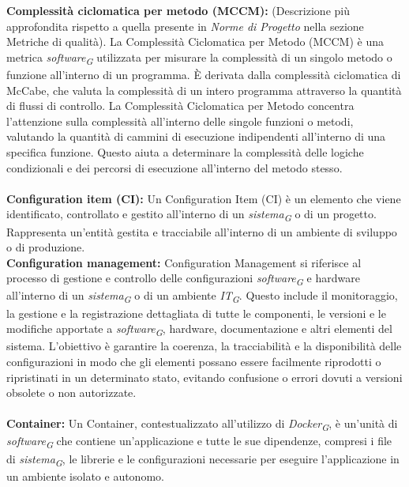 \documentclass{article}
\begin{document}
\\
\\
\textbf{Complessità ciclomatica per metodo (MCCM):} (Descrizione più approfondita rispetto a quella presente in \textit{Norme di Progetto} nella sezione Metriche di qualità). La Complessità Ciclomatica per Metodo (MCCM) è una metrica \textit{software}\textsubscript{\textit{G}} utilizzata per misurare la complessità di un singolo metodo o funzione all'interno di un programma. È derivata dalla complessità ciclomatica di McCabe, che valuta la complessità di un intero programma attraverso la quantità di flussi di controllo.
La Complessità Ciclomatica per Metodo concentra l'attenzione sulla complessità all'interno delle singole funzioni o metodi, valutando la quantità di cammini di esecuzione indipendenti all'interno di una specifica funzione. Questo aiuta a determinare la complessità delle logiche condizionali e dei percorsi di esecuzione all'interno del metodo stesso.
\\
\\
\textbf{Configuration item (CI):} Un Configuration Item (CI) è un elemento che viene identificato, controllato e gestito all'interno di un \textit{sistema}\textsubscript{\textit{G}} o di un progetto. Rappresenta un'entità gestita e tracciabile all'interno di un ambiente di sviluppo o di produzione.
\pagebreak
\\
\textbf{Configuration management:} Configuration Management si riferisce al processo di gestione e controllo delle configurazioni \textit{software}\textsubscript{\textit{G}} e hardware all'interno di un \textit{sistema}\textsubscript{\textit{G}} o di un ambiente \textit{IT}\textsubscript{\textit{G}}. Questo include il monitoraggio, la gestione e la registrazione dettagliata di tutte le componenti, le versioni e le modifiche apportate a \textit{software}\textsubscript{\textit{G}}, hardware, documentazione e altri elementi del sistema. L'obiettivo è garantire la coerenza, la tracciabilità e la disponibilità delle configurazioni in modo che gli elementi possano essere facilmente riprodotti o ripristinati in un determinato stato, evitando confusione o errori dovuti a versioni obsolete o non autorizzate.
\\
\\
\textbf{Container:} Un Container, contestualizzato all’utilizzo di \textit{Docker}\textsubscript{\textit{G}}, è un'unità di \textit{software}\textsubscript{\textit{G}} che contiene un'applicazione e tutte le sue dipendenze, compresi i file di \textit{sistema}\textsubscript{\textit{G}}, le librerie e le configurazioni necessarie per eseguire l'applicazione in un ambiente isolato e autonomo.
\end{document}
